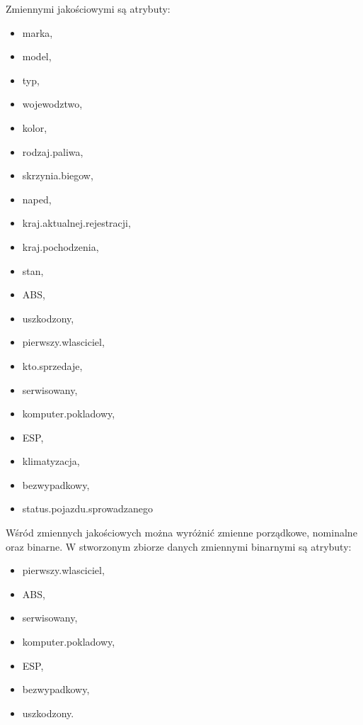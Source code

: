 \documentclass[12pt,a4paper]{report}
\begin{document}
Zmiennymi jakościowymi są atrybuty:
\begin{multicols}{3} 
\begin{itemize}
	\item marka,
	\item model,
	\item typ,
	\item wojewodztwo,
	\item kolor,
	\item rodzaj.paliwa,
	\item skrzynia.biegow,
	\item naped,
	\item kraj.aktualnej.rejestracji,%
	\item kraj.pochodzenia,%
	\item stan,
	\item ABS,
	\item uszkodzony,
	\item pierwszy.wlasciciel,%
	\item kto.sprzedaje,%
	\item serwisowany,%
	\item komputer.pokladowy,%
	\item ESP,
	\item klimatyzacja,%
	\item bezwypadkowy,%
	\item status.pojazdu.sprowadzanego%
\end{itemize}
\end{multicols}


Wśród zmiennych jakościowych można wyróżnić zmienne porządkowe, nominalne oraz binarne. W stworzonym zbiorze danych zmiennymi binarnymi są atrybuty: 
\begin{multicols}{3}
\begin{itemize}
	\item pierwszy.wlasciciel,%
	\item ABS,
	\item serwisowany,%
	\item komputer.pokladowy, %
	\item ESP,
	\item bezwypadkowy,%
	\item uszkodzony.%
\end{itemize}
\end{multicols}
\end{document}

